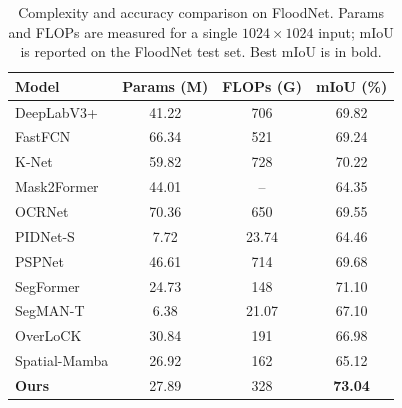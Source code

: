 \documentclass[lettersize,journal]{IEEEtran}
\begin{document}
\begin{table}[!ht]
\caption{Complexity and accuracy comparison on FloodNet. Params and FLOPs are measured for a single $1024\times1024$ input; mIoU is reported on the FloodNet test set. Best mIoU is in bold.}
\label{tab:complexity}
\centering
\footnotesize
\setlength{\tabcolsep}{4pt}
\renewcommand{\arraystretch}{1.15}
\begin{tabular}{lccc}
\hline
Model & Params (M) & FLOPs (G) & mIoU (\%) \\
\hline
DeepLabV3+\cite{chenRethinkingAtrousConvolution2017} &41.22 & 706 & 69.82 \\
FastFCN\cite{wu2019fastfcn} &66.34 & 521 & 69.24 \\
K-Net\cite{zhang2021knet} &59.82 & 728 & 70.22 \\
Mask2Former\cite{NEURIPS2021_950a4152} &44.01 & -- & 64.35 \\
OCRNet\cite{YuanCW20} &70.36 & 650 & 69.55 \\
PIDNet-S\cite{xu2022pidnet} &7.72 & 23.74 & 64.46 \\
PSPNet\cite{zhaoPyramidSceneParsing2017a} &46.61 & 714 & 69.68 \\
SegFormer\cite{xie2021segformer} &24.73 & 148 & 71.10 \\
SegMAN-T\cite{SegMAN} &6.38 & 21.07 & 67.10 \\
OverLoCK\cite{lou2025overlock} &30.84 & 191 & 66.98 \\
Spatial-Mamba\cite{xiao2025spatialmamba} &26.92 & 162 & 65.12 \\
\hline
\textbf{Ours} & 27.89 & 328 & \textbf{73.04} \\
\hline
\end{tabular}
\end{table}
\end{document}
